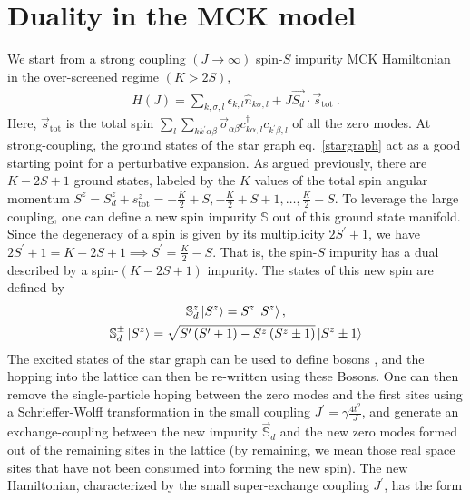 \documentclass[reprint,prb,superscriptaddress]{revtex4-2}
\begin{document}
\section{Duality in the MCK model}
We start from a strong coupling \((J \to \infty)\) spin-\(S\) impurity MCK Hamiltonian in the over-screened regime \(\left( K > 2S \right) \),
\begin{equation}\begin{aligned}
	\label{strong_ham}
	H(J) = \sum_{k,\sigma,l}\epsilon_{k,l} \hat n_{k\sigma,l} + J \vec{S_d}\cdot\vec{s}_\text{tot}~.
\end{aligned}\end{equation}
Here, \(\vec s_\text{tot}\) is the total spin \(\sum_l \sum_{kk^\prime \alpha\beta} \vec \sigma_{\alpha\beta}c^\dagger_{k\alpha,l}c_{k^\prime\beta,l}\) of all the zero modes. At strong-coupling, the ground states of the star graph eq.~\ref{stargraph} act as a good starting point for a perturbative expansion. As argued previously, there are \(K-2S+1\) ground states, labeled by the \(K\) values of the total spin angular momentum \(S^z = S_d^z + s_\text{tot}^z = -\frac{K}{2} + S, -\frac{K}{2} + S + 1, \ldots, \frac{K}{2} - S\). To leverage the large coupling, one can define a new spin impurity \(\mathbb{S}\) out of this ground state manifold. Since the degeneracy of a spin is given by its multiplicity \(2S^\prime + 1\), we have \(2S^\prime + 1 = K-2S+1 \implies S^\prime = \frac{K}{2} - S\). That is, the spin-\(S\) impurity has a dual described by a spin-\((K-2S+1)\) impurity. The states of this new spin are defined by
\begin{gather}
	\mathbb{S}_d^z \ket{S^z} = S^z \ket{S^z},\nonumber\\
	\mathbb{S}_d^\pm \ket{S^z} = \sqrt{S^\prime\left( S^\prime + 1 \right) - S^z\left( S^z \pm 1\right)} \ket{S^z \pm 1}
\end{gather}
The excited states of the star graph can be used to define bosons \cite{kroha_kolf_2007}, and the hopping into the lattice can then be re-written using these Bosons. One can then remove the single-particle hoping between the zero modes and the first sites using a Schrieffer-Wolff transformation in the small coupling \(J^\prime = \gamma \frac{4t^2}{J}\), and generate an exchange-coupling between the new impurity \(\vec {\mathbb{S}}_d\) and the new zero modes formed out of the remaining sites in the lattice \cite{kroha_kolf_2007} (by remaining, we mean those real space sites that have not been consumed into forming the new spin). The new Hamiltonian, characterized by the small super-exchange  coupling \(J^\prime\), has the form
\end{document}
